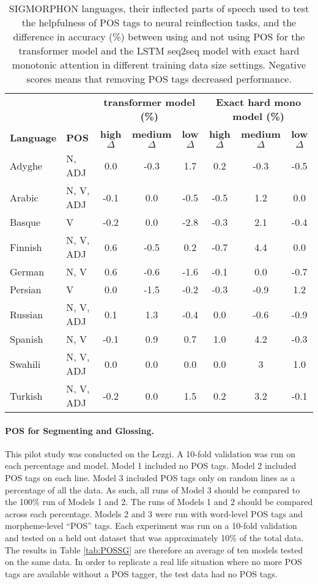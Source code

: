 \begin{table}[htb]
    \centering
    \begin{tabular}{ll|ccc|ccc}
    \toprule
        & & \multicolumn{3}{c|}{\textbf{transformer model (\%)}} & \multicolumn{3}{|c}{\textbf{Exact hard mono model (\%)}} \\
        \cline{3-8}
       \textbf{Language} & \textbf{POS} & \textbf{high $\Delta$} & \textbf{medium $\Delta$} & \textbf{low $\Delta$} & \textbf{high $\Delta$} & \textbf{medium $\Delta$} & \textbf{low $\Delta$} \\
      Adyghe  & N, ADJ & 0.0 & -0.3 & 1.7 & 0.2 & -0.3 & -0.5 \\
      Arabic & N, V, ADJ & -0.1 & 0.0 & -0.5 & -0.5 & 1.2 & 0.0 \\
      Basque &  V & -0.2 & 0.0 & -2.8 & -0.3 & 2.1 & -0.4 \\
      Finnish & N, V, ADJ & 0.6 & -0.5 & 0.2 & -0.7 & 4.4 & 0.0 \\
      German & N, V & 0.6 & -0.6 & -1.6 & -0.1 & 0.0 & -0.7 \\
      Persian & V & 0.0 & -1.5 & -0.2 & -0.3 & -0.9 & 1.2 \\
      Russian & N, V, ADJ & 0.1 & 1.3 & -0.4 & 0.0 & -0.6 & -0.9 \\
      Spanish & N, V & -0.1 & 0.9 & 0.7 & 1.0 & 4.2 & -0.3 \\
      Swahili & N, V, ADJ & 0.0 & 0.0 & 0.0 & 0.0 & 3 & 1.0 \\
      Turkish & N, V, ADJ & -0.2 & 0.0 & 1.5 & 0.2 & 3.2 & -0.1 \\
    \end{tabular}
    \caption[SIGMORPHON languages Reinflection with/out POS tags]{SIGMORPHON languages, their inflected parts of speech used to test the helpfulness of POS tags to neural reinflection tasks, and the difference in accuracy (\%) between using and not using POS for the transformer model and the LSTM seq2seq model with exact hard monotonic attention in different training data size settings. Negative scores means that removing POS tags decreased performance.}
    \label{tab:POSIGT2P}
\end{table}


\paragraph{POS for Segmenting and Glossing.}
This pilot study was conducted on the Lezgi. A 10-fold validation was run on each percentage and model. Model 1 included no POS tags. Model 2 included POS tags on each line. Model 3 included POS tags only on random lines as a percentage of all the data. As such, all runs of Model 3 should be compared to the 100\% run of Models 1 and 2. The runs of Models 1 and 2 should be compared across each percentage. Models 2 and 3 were run with word-level POS tags and morpheme-level ``POS'' tags. Each experiment was run on a 10-fold validation and tested on a held out dataset that was approximately 10\% of the total data. The results in Table \ref{tab:POSSG} are therefore an average of ten models tested on the same data. In order to replicate a real life situation where no more POS tags are available without a POS tagger, the test data had no POS tags. 

